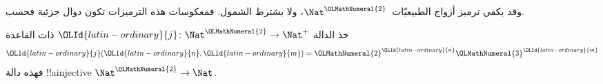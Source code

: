 \documentclass[../../../include/open-logic-section]{subfiles}
\begin{document}
وقد يكفي ترميز أزواج الطبيعيّات~$\Nat^\OLMathNumeral{2}$، ولا يشترط الشمول.
فمعكوسات هذه الترميزات تكون دوال جزئية فحسب.

\begin{ex}
خذ الدالة $\OLId{latin-ordinary}{j}\colon \Nat^\OLMathNumeral{2} \to \Nat^+$ ذات القاعدة
\[
\OLId{latin-ordinary}{j}(\OLId{latin-ordinary}{n},\OLId{latin-ordinary}{m}) = \OLMathNumeral{2}^\OLId{latin-ordinary}{n}\OLMathNumeral{3}^\OLId{latin-ordinary}{m}
\]
فهذه دالة !!a{injective} $\Nat^\OLMathNumeral{2} \to \Nat$.
\end{ex}
\end{document}
